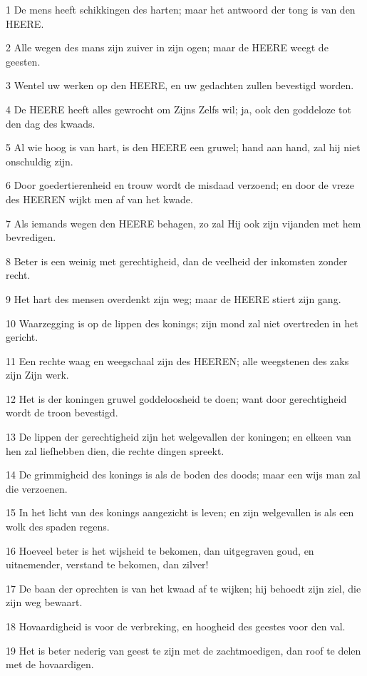 \par 1 De mens heeft schikkingen des harten; maar het antwoord der tong is van den HEERE.
\par 2 Alle wegen des mans zijn zuiver in zijn ogen; maar de HEERE weegt de geesten.
\par 3 Wentel uw werken op den HEERE, en uw gedachten zullen bevestigd worden.
\par 4 De HEERE heeft alles gewrocht om Zijns Zelfs wil; ja, ook den goddeloze tot den dag des kwaads.
\par 5 Al wie hoog is van hart, is den HEERE een gruwel; hand aan hand, zal hij niet onschuldig zijn.
\par 6 Door goedertierenheid en trouw wordt de misdaad verzoend; en door de vreze des HEEREN wijkt men af van het kwade.
\par 7 Als iemands wegen den HEERE behagen, zo zal Hij ook zijn vijanden met hem bevredigen.
\par 8 Beter is een weinig met gerechtigheid, dan de veelheid der inkomsten zonder recht.
\par 9 Het hart des mensen overdenkt zijn weg; maar de HEERE stiert zijn gang.
\par 10 Waarzegging is op de lippen des konings; zijn mond zal niet overtreden in het gericht.
\par 11 Een rechte waag en weegschaal zijn des HEEREN; alle weegstenen des zaks zijn Zijn werk.
\par 12 Het is der koningen gruwel goddeloosheid te doen; want door gerechtigheid wordt de troon bevestigd.
\par 13 De lippen der gerechtigheid zijn het welgevallen der koningen; en elkeen van hen zal liefhebben dien, die rechte dingen spreekt.
\par 14 De grimmigheid des konings is als de boden des doods; maar een wijs man zal die verzoenen.
\par 15 In het licht van des konings aangezicht is leven; en zijn welgevallen is als een wolk des spaden regens.
\par 16 Hoeveel beter is het wijsheid te bekomen, dan uitgegraven goud, en uitnemender, verstand te bekomen, dan zilver!
\par 17 De baan der oprechten is van het kwaad af te wijken; hij behoedt zijn ziel, die zijn weg bewaart.
\par 18 Hovaardigheid is voor de verbreking, en hoogheid des geestes voor den val.
\par 19 Het is beter nederig van geest te zijn met de zachtmoedigen, dan roof te delen met de hovaardigen.
